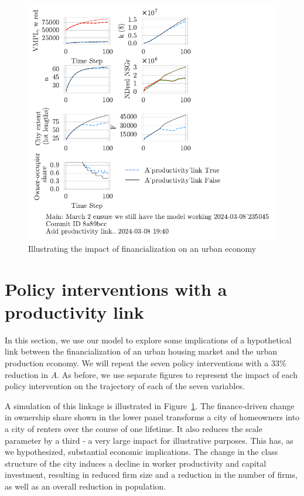 \begin{figure}[h!tb]\label{fig-impact-channel-example}
    \centering
    \includegraphics[scale=1, trim=.25cm 2cm .25cm .25cm, clip]{fig/productivity_link.pdf}
    \caption{Illustrating the impact of financialization on an urban economy}
\end{figure}


\section{Policy interventions with a productivity link}

In this section, we use our model to explore some implications of a hypothetical link between the financialization of an urban housing market and the urban production economy. 
We will repeat the seven policy interventions with a 33\% reduction in $A$.  As before, we use separate figures to represent the impact of each policy intervention on the trajectory of each of the seven variables. 

A simulation of this linkage is illustrated in Figure~\ref{fig-impact-channel-example}. The finance-driven change in ownership share shown in the lower panel transforms a city of homeowners into a city of renters over the course of one lifetime. It also reduces the scale parameter by a third - a very large impact for illustrative purposes. This has, as we hypothesized, substantial economic implications. The change in the class structure of the city induces a decline in worker productivity and capital investment, resulting in reduced firm size and a reduction in the number of firms, as well as an overall reduction in population. 

